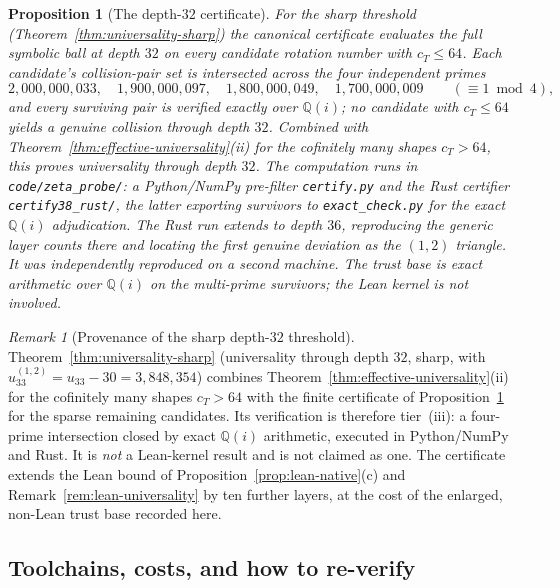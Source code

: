 \documentclass[11pt]{article}
\theoremstyle{plain}
\newtheorem{proposition}[theorem]{Proposition}
\theoremstyle{definition}
\theoremstyle{remark}
\newtheorem{remark}[theorem]{Remark}
\begin{document}
\begin{proposition}[The depth-$32$ certificate]
\label{prop:modular-cert}
For the sharp threshold (Theorem~\ref{thm:universality-sharp}) the canonical
certificate evaluates the full symbolic ball at depth $32$ on every
candidate rotation number with $c_T\le 64$. Each candidate's
collision-pair set is intersected across the four independent primes
\[
2{,}000{,}000{,}033,\quad
1{,}900{,}000{,}097,\quad
1{,}800{,}000{,}049,\quad
1{,}700{,}000{,}009
\qquad (\equiv 1\bmod 4),
\]
and every surviving pair is verified exactly over $\mathbb{Q}(i)$; no
candidate with $c_T\le 64$ yields a genuine collision through depth $32$.
Combined with Theorem~\ref{thm:effective-universality}(ii) for the
cofinitely many shapes $c_T>64$, this proves universality through depth
$32$. The computation runs in \texttt{code/zeta\_probe/}: a
Python/NumPy pre-filter \texttt{certify.py} and the Rust certifier
\texttt{certify38\_rust/}, the latter exporting survivors to
\texttt{exact\_check.py} for the exact $\mathbb{Q}(i)$ adjudication. The
Rust run extends to depth $36$, reproducing the generic layer counts
there and locating the first genuine deviation as the $(1,2)$ triangle.
It was independently reproduced on a second machine. The trust base is
exact arithmetic over $\mathbb{Q}(i)$ on the multi-prime survivors; the
Lean kernel is \emph{not} involved.
\end{proposition}

\begin{remark}[Provenance of the sharp depth-$32$ threshold]
\label{rem:depth32-provenance}
Theorem~\ref{thm:universality-sharp} (universality through depth $32$,
sharp, with $u_{33}^{(1,2)}=u_{33}-30=3{,}848{,}354$) combines
Theorem~\ref{thm:effective-universality}(ii) for the cofinitely many
shapes $c_T>64$ with the finite certificate of
Proposition~\ref{prop:modular-cert} for the sparse remaining candidates.
Its verification is therefore tier~(iii): a four-prime intersection
closed by exact $\mathbb{Q}(i)$ arithmetic, executed in Python/NumPy and
Rust. It is \emph{not} a Lean-kernel result and is not claimed as one.
The certificate extends the Lean bound of
Proposition~\ref{prop:lean-native}(c) and
Remark~\ref{rem:lean-universality} by ten further layers, at the cost of
the enlarged, non-Lean trust base recorded here.
\end{remark}

\subsection{Toolchains, costs, and how to re-verify}
\label{ssec:reproduce-toolchains}
\end{document}
